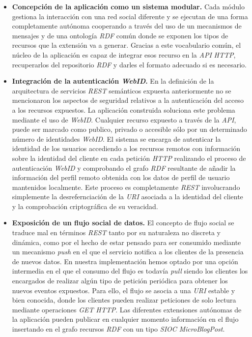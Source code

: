 \begin{itemize}
\item \textbf{Concepci\'on de la aplicaci\'on como un sistema modular.} Cada m\'odulo gestiona la interacci\'on con una red social diferente y se ejecutan de una forma completamente aut\'onoma cooperando a trav\'es del uso de un mecanismos de mensajes y de una ontolog\'ia \textit{RDF} com\'un donde se exponen los tipos de recursos que la extensi\'on va a generar. Gracias a este vocabulario com\'un, el n\'ucleo de la aplicaci\'on es capaz de integrar esos recurso en la \textit{API} \textit{HTTP}, recuperarlos del repositorio \textit{RDF} y darles el formato adecuado si es necesario.
\item \textbf{Integraci\'on de la autenticaci\'on \textit{WebID}.} En la definici\'on de la arquitectura de servicios \textit{REST} sem\'anticos expuesta anteriormente no se mencionaron los aspectos de seguridad relativos a la autenticaci\'on del acceso a los recursos expuestos. La aplicaci\'on construida soluciona este problema mediante el uso de \textit{WebID}. Cualquier recurso expuesto a trav\'es de la \textit{API}, puede ser marcado como publico, privado o accesible s\'olo por un determinado n\'umero de identidades \textit{WebID}. El sistema se encarga de autenticar la identidad de los usuarios accediendo a los recursos remotos con informaci\'on sobre la identidad del cliente en cada petici\'on \textit{HTTP} realizando el proceso de autenticaci\'on \textit{WebID} y comprobando el grafo \textit{RDF} resultante de a\~nadir la informaci\'on del perfil remoto obtenida con los datos de perfil de usuario mantenidos localmente. Este proceso es completamente \textit{REST} involucrando simplemente la desrefernciaci\'on de la \textit{URI} asociada a la identidad del cliente y la comprobaci\'on criptogr\'afica de su veracidad.
\item \textbf{Exposici\'on de un flujo social de datos.} El concepto de flujo social se traduce mal en t\'erminos \textit{REST} tanto por su naturaleza no discreta y din\'amica, como por el hecho de estar pensado para ser consumido mediante un mecanismo \textit{push} en el que el servicio notifica a los clientes de la presencia de nuevos datos. En nuestra implementaci\'on hemos optado por una opci\'on intermedia en el que el consumo del flujo es todav\'ia \textit{pull} siendo los clientes los encargados de realizar alg\'un tipo de petici\'on peri\'odica para obtener los nuevos eventos expuestos. Para ello, el flujo se asocia a una \textit{URI} estable y bien conocida, donde los clientes pueden realizar peticiones de solo lectura mediante operaciones \textit{GET} \textit{HTTP}. Las diferentes extensiones aut\'onomas de la aplicaci\'on pueden publicar en cualquier momento informaci\'on en el flujo insertando en el grafo recursos \textit{RDF} con un tipo \textit{SIOC} \textit{MicroBlogPost}.

\end{itemize}
